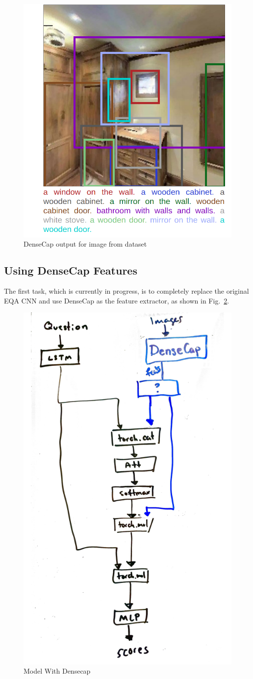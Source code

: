 \begin{figure}[h]
     \centering
     \includegraphics[width=.5\textwidth]{./figure/example_densecap.png}
     \caption{DenseCap output for image from dataset}
     \label{fig:example_densecap}
\end{figure}



\subsection{Using DenseCap Features}
The first task, which is currently in progress, is to completely replace the original EQA CNN and use DenseCap as the feature extractor, as shown in Fig.~\ref{fig:densecap_feats}.

\begin{figure}[h]
     \centering
     \includegraphics[width=.5\textwidth]{./figure/densecapsketch.png}
     \caption{Model With Densecap}
     \label{fig:densecap_feats}
\end{figure}


